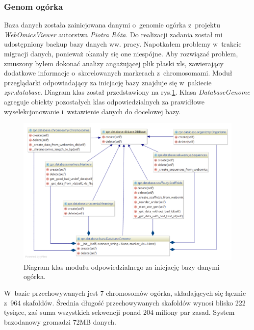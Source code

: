 \documentclass[a4paper,12pt,oneside]{mwrep}  %
\begin{document}
\subsubsection{Genom ogórka}
Baza danych została zainicjowana danymi o~genomie ogórka z~projektu \emph{WebOmicsViewer} autorstwa \emph{Piotra Róża}. Do realizacji zadania został mi  udostępniony backup bazy danych ww. pracy. Napotkałem problemy w~trakcie migracji danych, ponieważ okazały się one niespójne. Aby rozwiązać problem, zmuszony byłem dokonać analizy angażującej plik płaski xls, zawierający dodatkowe informacje o~skorelowanych markerach z~chromosomami. Moduł przeglądarki odpowiadający za inicjację bazy znajduje się w~pakiecie \emph{zpr.database}. Diagram klas został przedstawiony na rys.\ref{diagram_klas_budowy_bazy}. Klasa \emph{DatabaseGenome} agreguje obiekty pozostałych klas odpowiedzialnych za prawidłowe wyselekcjonowanie i~wstawienie danych do docelowej bazy.
\begin{figure}[h]
\centering
\includegraphics[width=1\textwidth]{grafika/model/final/budowa_bazy.png}
\caption{Diagram klas modułu odpowiedzialnego za inicjację bazy danymi ogórka.}
\label{diagram_klas_budowy_bazy}
\end{figure}

W~bazie przechowywanych jest 7 chromosomów ogórka, składających się łącznie z~964 skafoldów. Średnia długość przechowywanych skafoldów wynosi blisko 222 tysiące, zaś suma wszystkich sekwencji ponad 204 miliony par zasad. System bazodanowy gromadzi 72MB danych.
\end{document}
